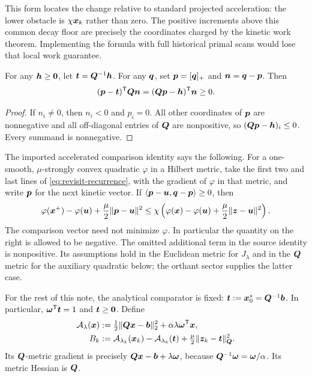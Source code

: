 This form locates the change relative to standard projected acceleration:
the lower obstacle is $\chi\bm{x}_k$ rather than zero. The positive increments
above this common decay floor are precisely the coordinates charged by
the kinetic work theorem. Implementing the formula with full historical
primal scans would lose that local work guarantee.

\begin{lemma}
\label{lem:revisit-orthant}
For any $\bm{h}\geq\bm{0}$, let $\bm{t}=\bm{Q}^{-1}\bm{h}$. For any $\bm{q}$, set
$\bm{p}=[\bm{q}]_+$ and $\bm{n}=\bm{q}-\bm{p}$. Then
\[
 (\bm{p}-\bm{t})^{\mathsf{T}}\bm{Q}\bm{n}=(\bm{Q}\bm{p}-\bm{h})^{\mathsf{T}}\bm{n}\geq0.
\]
\end{lemma}
\begin{proof}
If $n_i\ne0$, then $n_i<0$ and $p_i=0$. All other coordinates of
$\bm{p}$ are nonnegative and all off-diagonal entries of $\bm{Q}$ are
nonpositive, so $(\bm{Q}\bm{p}-\bm{h})_i\leq0$. Every summand is nonnegative.
\end{proof}

The imported accelerated comparison identity says the following.
For a one-smooth, $\mu$-strongly convex quadratic $\varphi$ in a Hilbert
metric, take the first two and last lines of
\cref{eq:revisit-recurrence}, with the gradient of $\varphi$ in that metric,
and write $\bm{p}$ for the next kinetic vector. If
$\langle\bm{p}-\bm{u},\bm{q}-\bm{p}\rangle\geq0$, then
\begin{equation}
 \varphi(\bm{x}^+)-\varphi(\bm{u})+\frac\mu2\|\bm{p}-\bm{u}\|^2
 \leq\chi\left(\varphi(\bm{x})-\varphi(\bm{u})
                          +\frac\mu2\|\bm{z}-\bm{u}\|^2\right).
 \label{eq:revisit-imported-comparison}
\end{equation}
The comparison vector need not minimize $\varphi$. In particular the
quantity on the right is allowed to be negative. The omitted additional
term in the source identity is nonpositive. Its assumptions hold in the
Euclidean metric for $J_\lambda$ and in the $\bm{Q}$ metric for the
auxiliary quadratic below; the orthant sector supplies the latter case.

For the rest of this note, the analytical comparator is fixed:
$\bm{t}:=\bm{x}_0^*=\bm{Q}^{-1}\bm{b}$. In particular,
$\bm{\omega}^{\mathsf{T}}\bm{t}=1$ and $\bm{t}\geq\bm{0}$.
Define
\begin{equation}
 \begin{aligned}
 \mathcal A_\lambda(\bm{x})
   &:=\tfrac12\|\bm{Q}\bm{x}-\bm{b}\|_2^2
                           +\alpha\lambda\bm{\omega}^{\mathsf{T}}\bm{x},\\
 B_k&:=\mathcal A_{\lambda_k}(\bm{x}_k)
       -\mathcal A_{\lambda_k}(\bm{t})
                       +\tfrac\mu2\|\bm{z}_k-\bm{t}\|_{\bm{Q}}^2.
 \end{aligned}
 \label{eq:revisit-bank}
\end{equation}
Its $\bm{Q}$-metric gradient is precisely
$\bm{Q}\bm{x}-\bm{b}+\lambda\bm{\omega}$, because
$\bm{Q}^{-1}\bm{\omega}=\bm{\omega}/\alpha$. Its metric Hessian is $\bm{Q}$.

